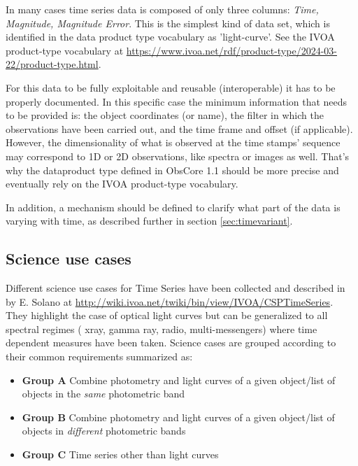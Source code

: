\documentclass[11pt,a4paper]{ivoa}
\begin{document}
In many cases time series data is composed of only three columns: \emph{Time, Magnitude, Magnitude Error}.
This is the simplest kind of data set,  which is identified in the data product type vocabulary as 'light-curve'. 
See the IVOA product-type vocabulary at \url{https://www.ivoa.net/rdf/product-type/2024-03-22/product-type.html}.

For this data to be fully exploitable and reusable (interoperable) it has to be properly documented. In this specific case the minimum information that needs to be provided is: the object coordinates (or name), the filter in which the observations have been carried out, and the time frame and offset (if applicable).
However, the dimensionality of what is observed at the time stamps' sequence may correspond to 1D or 2D observations, like spectra or images  as well. 
That's why the dataproduct type  defined in ObsCore 1.1 should be more precise and eventually rely on the IVOA product-type vocabulary.

In addition, a mechanism should be defined to clarify what part of the data is varying with time, as described further in section \ref{sec:timevariant}. 

\subsection{Science use cases}
\label{sect:usecases}
Different science use cases for Time Series have been collected and described in by E. Solano  at \url{http://wiki.ivoa.net/twiki/bin/view/IVOA/CSPTimeSeries}. 
They highlight the case of optical light curves but can be generalized to all spectral regimes ( xray, gamma ray, radio, multi-messengers)  where time dependent measures have been taken.
Science cases are grouped according to their common requirements summarized as: 
\begin{itemize}
\item \textbf{Group A} Combine photometry and light curves of a given object/list of objects in the \emph{same} photometric band
\item \textbf{Group B} Combine photometry and light curves of a given object/list of objects in \emph{different} photometric bands
\item \textbf{Group C} Time series other than light curves
\end{itemize}
\end{document}
